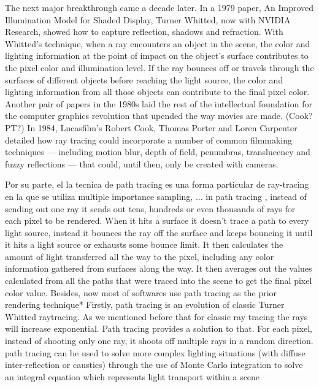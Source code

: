     The next major breakthrough came a decade later. In a 1979 paper, An Improved Illumination Model for Shaded Display, Turner Whitted, now with NVIDIA Research, showed how to capture reflection, shadows and refraction.
    With Whitted’s technique, when a ray encounters an object in the scene, the color and lighting information at the point of impact on the object’s surface contributes to the pixel color and illumination level. If the ray bounces off or travels through the surfaces of different objects before reaching the light source, the color and lighting information from all those objects can contribute to the final pixel color.
    Another pair of papers in the 1980s laid the rest of the intellectual foundation for the computer graphics revolution that upended the way movies are made. (Cook? PT?)
    In 1984, Lucasfilm’s Robert Cook, Thomas Porter and Loren Carpenter detailed how ray tracing could incorporate a number of common filmmaking techniques — including motion blur, depth of field, penumbras, translucency and fuzzy reflections — that could, until then, only be created with cameras.
    
    Por su parte, el la tecnica de path tracing es una forma particular de ray-tracing en la que se utiliza multiple importance sampling, ...
    in path tracing , instead of sending out one ray it sends out tens, hundreds or even thousands of rays for each pixel to be rendered. When it hits a surface it doesn’t trace a path to every light source, instead it bounces the ray off the surface and keeps bouncing it until it hits a light source or exhausts some bounce limit. It then calculates the amount of light transferred all the way to the pixel, including any color information gathered from surfaces along the way. It then averages out the values calculated from all the paths that were traced into the scene to get the final pixel color value.  Besides, now most of softwares use path tracing as the prior rendering technique*
    Firstly, path tracing is an evolution of classic Turner Whitted raytracing. As we mentioned before that for classic ray tracing the rays will increase exponential. Path tracing provides a solution to that. For each pixel, instead of shooting only one ray, it shoots off multiple rays in a random direction. 
    path tracing can be used to solve more complex lighting situations (with diffuse inter-reflection or caustics) through the use of Monte Carlo integration to solve an integral equation which represents light transport within a scene 
    \singlespacing

